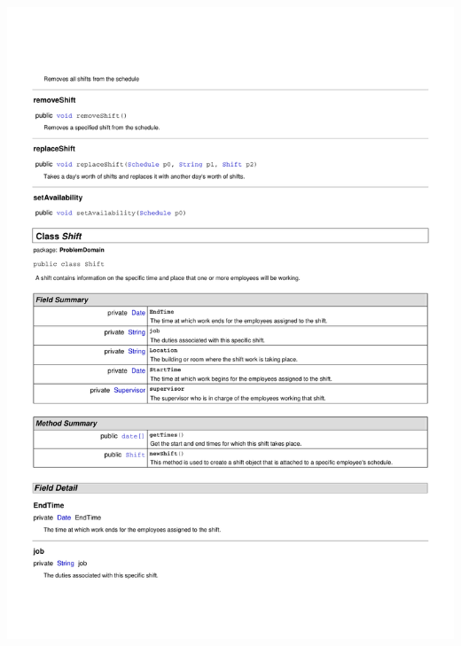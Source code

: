 \documentclass[letterpaper,12pt]{report}
\begin{document}
\includegraphics[scale=0.9,trim=20mm 30mm 25mm 25mm]{externals/ProblemDomainDataDictionary12.pdf}
\newpage
\end{document}
